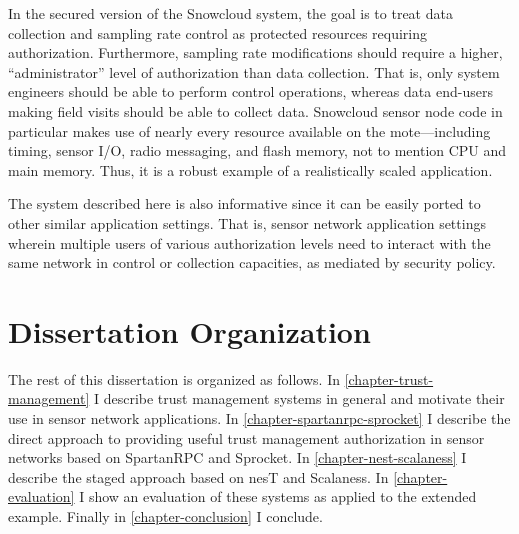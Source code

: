 \snowcloudfig

In the secured version of the Snowcloud system, the goal is to treat data collection and
sampling rate control as protected resources requiring authorization. Furthermore, sampling rate
modifications should require a higher, ``administrator'' level of authorization than data
collection. That is, only system engineers should be able to perform control operations, whereas
data end-users making field visits should be able to collect data. Snowcloud sensor node code in
particular makes use of nearly every resource available on the mote---including timing, sensor
I/O, radio messaging, and flash memory, not to mention CPU and main memory. Thus, it is a robust
example of a realistically scaled application.

The system described here is also informative since it can be easily ported to other similar
application settings. That is, sensor network application settings wherein multiple users of
various authorization levels need to interact with the same network in control or collection
capacities, as mediated by security policy.

\section{Dissertation Organization}

The rest of this dissertation is organized as follows. In \autoref{chapter-trust-management} I
describe trust management systems in general and motivate their use in sensor network
applications. In \autoref{chapter-spartanrpc-sprocket} I describe the direct approach to
providing useful trust management authorization in sensor networks based on SpartanRPC and
Sprocket. In \autoref{chapter-nest-scalaness} I describe the staged approach based on nesT and
Scalaness. In \autoref{chapter-evaluation} I show an evaluation of these systems as applied to
the extended example. Finally in \autoref{chapter-conclusion} I conclude.

